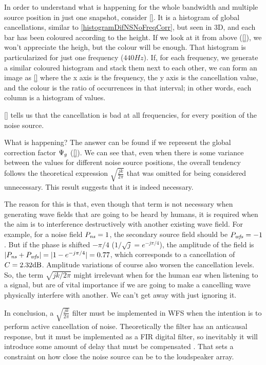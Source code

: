 In order to understand what is happening for the whole bandwidth and multiple source position in just one snapshot, consider \autoref{}. It is a histogram of global cancellations, similar to \autoref{histogramDifNSNoFreqCorr}, but seen in 3D, and each bar has been coloured according to the height. If we look at it from above (\autoref{}), we won't appreciate the heigh, but the colour will be enough. That histogram is particularized for just one frequency ($440\si{Hz}$). If, for each frequency, we generate a similar coloured histogram and stack them next to each other, we can form an image as \autoref{} where the x axis is the frequency, the y axis is the cancellation value, and the colour is the ratio of occurrences in that interval; in other words, each column is a histogram of values.

\autoref{} tells us that the cancellation is bad at all frequencies, for every position of the noise source.

What is happening? The answer can be found if we represent the global correction factor $\globalCorrectionFactor$ (\autoref{}). We can see that, even when there is some variance between the values for different noise source positions, the overall tendency follows the theoretical expression $\sqrt{\frac{jk}{2\pi}}$ that was omitted for being considered unnecessary. This result suggests that it is indeed necessary.

The reason for this is that, even though that term is not necessary when generating wave fields that are going to be heard by humans, it is required when the aim is to interference destructively with another existing wave field. For example, for a noise field $\Field[ns][frequency] = 1$, the secondary source field should be $\Field[wfs][frequency] = -1$. But if the phase is shifted $-\pi/4$ ($1/\sqrt{j} = e^{-j\pi/4}$), the amplitude of the field is $|\Field[ns][frequency] + \Field[wfs][frequency]| = |1 - e^{-j\pi/4}| = 0.77$, which corresponds to a cancellation of $\cancellation = 2.32\si{dB}$. Amplitude variations of course also worsen the cancellation levels. So, the term $\sqrt{jk/2\pi}$ might irrelevant when for the human ear when listening to a signal, but are of vital importance if we are going to make a cancelling wave physically interfere with another. We can't get away with just ignoring it.

In conclusion, a $\sqrt{\frac{jk}{2\pi}}$ filter must be implemented in WFS when the intention is to perform active cancellation of noise. Theoretically the filter has an anticausal response, but it must be implemented as a FIR digital filter, so inevitably it will introduce some amount of delay that must be compensated \cite{Lapini2018}. That sets a constraint on how close the noise source can be to the loudspeaker array.